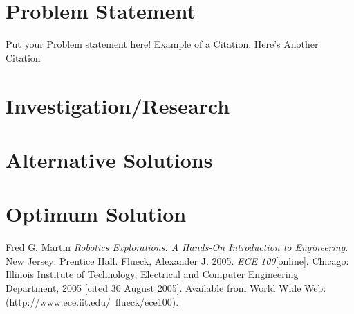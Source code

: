 \begin{comment}
Notes goes here!
\end{comment}

\section{Problem Statement}
Put your Problem statement here! Example of a Citation\cite[p.219]{Robotics}. Here's Another Citation\cite{Flueck}

\section{Investigation/Research}

\section{Alternative Solutions}

\section{Optimum Solution}

\begin{thebibliography}{5}
 Fred G. Martin \emph{Robotics Explorations: A Hands-On Introduction to Engineering}. New Jersey: Prentice Hall.
  Flueck, Alexander J. 2005. \emph{ECE 100}[online]. Chicago: Illinois Institute of Technology, Electrical and Computer Engineering Department, 2005 [cited 30
August 2005]. Available from World Wide Web: (http://www.ece.iit.edu/~flueck/ece100).
\end{thebibliography}
